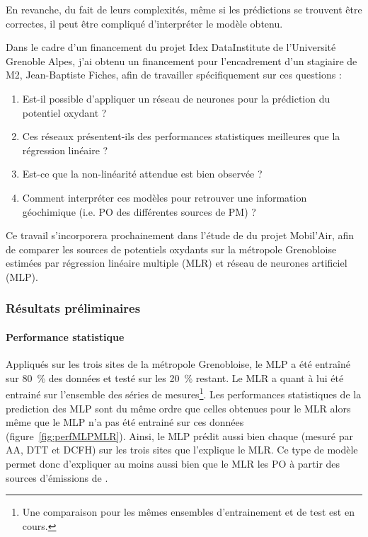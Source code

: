 En revanche, du fait de leurs complexités, même si les prédictions se trouvent être
correctes, il peut être compliqué d'interpréter le modèle obtenu.


Dans le cadre d'un financement du projet Idex DataInstitute de l'Université Grenoble Alpes, j'ai
obtenu un financement pour l'encadrement d'un stagiaire de M2, Jean-Baptiste Fiches, afin
de travailler spécifiquement sur ces questions :
\begin{enumerate}
    \item Est-il possible d'appliquer un réseau de neurones pour la prédiction du potentiel
        oxydant ?
    \item Ces réseaux présentent-ils des performances statistiques meilleures que la
        régression linéaire ?
    \item Est-ce que la non-linéarité attendue est bien observée ?
    \item Comment interpréter ces modèles pour retrouver une information géochimique (i.e.
        PO des différentes sources de PM) ?
\end{enumerate}
Ce travail s'incorporera prochainement dans l'étude de \cite{borlazaUrbaninprep.} du
projet Mobil'Air, afin de comparer les sources de potentiels oxydants sur la
métropole Grenobloise estimées par régression linéaire multiple (MLR) et réseau de
neurones artificiel (MLP).


\subsubsection{Résultats préliminaires}%
\label{ssub:résultats_préliminaires}

\paragraph{Performance statistique}%
\label{par:performance_statistique}

Appliqués sur les trois sites de la métropole Grenobloise, le MLP a été entraîné sur
\SI{80}{\percent} des données et testé sur les \SI{20}{\percent} restant. Le MLR a quant à
lui été entrainé sur l'ensemble des séries de mesures\footnote{Une comparaison pour les mêmes
ensembles d'entrainement et de test est en cours.}.
Les performances statistiques de la prediction des MLP sont du même ordre que celles
obtenues pour le MLR alors même que le MLP n'a pas été entrainé sur ces données (figure~\ref{fig:perfMLPMLR}).
Ainsi, le MLP prédit aussi bien chaque \POv{}
(mesuré par AA, DTT et DCFH) sur les trois sites que l'explique le MLR.
Ce type de modèle permet donc d'expliquer au moins aussi bien que le MLR les PO à partir
des sources d'émissions de \PMdix.

